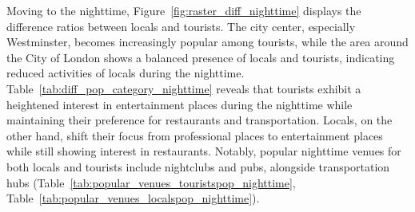 \documentclass{article}
\begin{document}
Moving to the nighttime, Figure~\ref{fig:raster_diff_nighttime} displays the difference ratios between locals and tourists. The city center, especially Westminster, becomes increasingly popular among tourists, while the area around the City of London shows a balanced presence of locals and tourists, indicating reduced activities of locals during the nighttime. Table~\ref{tab:diff_pop_category_nighttime} reveals that tourists exhibit a heightened interest in entertainment places during the nighttime while maintaining their preference for restaurants and transportation. Locals, on the other hand, shift their focus from professional places to entertainment places while still showing interest in restaurants. Notably, popular nighttime venues for both locals and tourists include nightclubs and pubs, alongside transportation hubs (Table~\ref{tab:popular_venues_touristspop_nighttime}, Table~\ref{tab:popular_venues_localspop_nighttime}).
\end{document}
